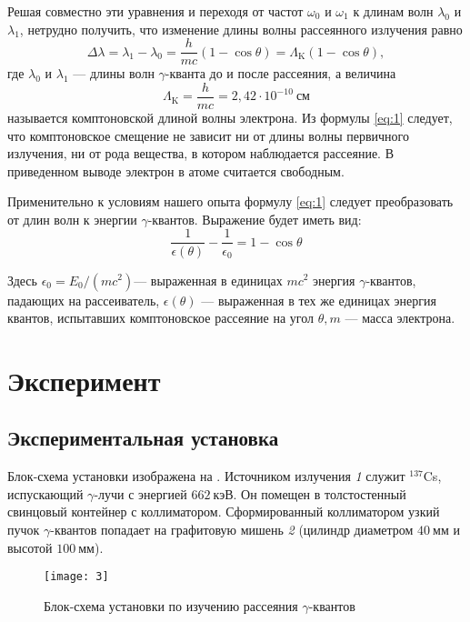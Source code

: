 \documentclass[a4paper, 12pt]{article}
\begin{document}
Решая совместно эти уравнения и переходя от частот $\omega_0$ и
$\omega_1$ к длинам волн $\lambda_0$ и $\lambda_1$, нетрудно получить,
что изменение длины волны рассеянного излучения равно
\begin{equation}
    \Delta \lambda = \lambda_1 - \lambda_0 = \frac{h}{mc} (1-\cos
    \theta) = \Lambda_\text{K} (1-\cos \theta),
    \label{eq:1}
\end{equation}
где $\lambda_0$ и $\lambda_1$ --- длины волн $\gamma$-кванта до и
после рассеяния, а величина
\[
    \Lambda_\text{K} = \frac{h}{mc} = 2,42 \cdot 10 ^{-10}\ \text{см}
\]
называется комптоновской длиной волны электрона. Из формулы
\eqref{eq:1} следует, что комптоновское смещение не зависит ни от
длины волны первичного излучения, ни от рода вещества, в котором
наблюдается рассеяние. В приведенном выводе электрон в атоме считается
свободным.

Применительно к условиям нашего опыта формулу \eqref{eq:1} следует
преобразовать от длин волн к энергии $\gamma$-квантов. Выражение будет
иметь вид:
\begin{equation}
    \frac{1}{\epsilon (\theta)} - \frac{1}{\epsilon_0} = 1 - \cos
    \theta
    \label{eq:2}
\end{equation}

Здесь $\epsilon_0 = E_0/ (mc^2)$--- выраженная в единицах $mc^2$
энергия $\gamma$-квантов, падающих на рассеиватель, $\epsilon(\theta)$
--- выраженная в тех же единицах энергия квантов, испытавших
комптоновское рассеяние на угол $\theta, m$ --- масса электрона.







\section{Эксперимент}
\subsection{Экспериментальная установка}
Блок-схема установки изображена на . Источником излучения
\textsl{1} служит $ ^{137}$Cs, испускающий $\gamma$-лучи с энергией
$662\ \text{кэВ}$. Он помещен в толстостенный свинцовый контейнер с
коллиматором. Сформированный коллиматором узкий пучок $\gamma$-квантов
попадает на графитовую мишень \textsl{2} (цилиндр диаметром $40\
\text{мм}$ и высотой $100\ \text{мм}$).

\begin{figure}[H]
    \texttt{[image: 3]} 
    \caption{Блок-схема установки по изучению рассеяния
    $\gamma$-квантов}
    \label{fig:2}
\end{figure}
\end{document}
